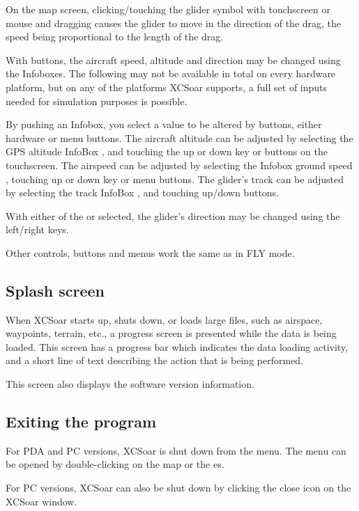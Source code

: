 On the map screen, clicking/touching the glider symbol
with touchscreen or mouse and dragging 
causes the glider to move in the direction of the drag, the
speed being proportional to the length of the drag.

With buttons, the aircraft
speed, altitude and direction may be changed using the Infoboxes.
The following may not be available in total on every hardware platform, but on 
any of the platforms XCSoar supports, a full set of inputs needed for 
simulation purposes is possible.

By pushing an Infobox, you select a value to be altered by buttons, either 
 hardware or menu buttons.
The aircraft altitude can be adjusted by selecting the GPS altitude
InfoBox , and touching the up or down key or buttons on the 
touchscreen.
The airspeed can be adjusted by selecting the Infobox ground speed
, touching up or down key or menu buttons.
The glider's track  can be adjusted by selecting the track InfoBox
, and touching up/down buttons.

With either of the  or 
selected, the glider's direction may be changed using the left/right keys.

Other controls, buttons and menus work the same as in FLY mode.


\subsection*{Splash screen}
When XCSoar starts up, shuts down, or loads large files, such as airspace,
waypoints, terrain, etc., a progress screen is presented while the data is being
loaded. This screen has a progress bar which indicates the data loading
activity, and a short line of text describing the action that is being performed.

This screen also displays the software version information.

\subsection*{Exiting the program}
For PDA and PC versions, XCSoar is shut down from the menu. The menu can be
opened by double-clicking on the map or the \InfoBox es.
\begin{quote}
\end{quote}

For PC versions, XCSoar can also be shut down by clicking the close icon
on the XCSoar window.
